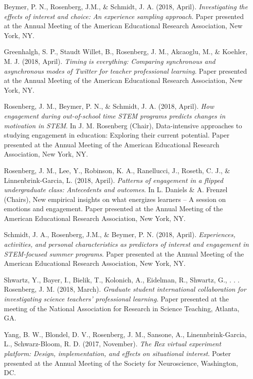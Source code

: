 \documentclass[14,]{article}
\begin{document}
Beymer, P. N., Rosenberg, J.M., \& Schmidt, J. A. (2018, April).
\emph{Investigating the effects of interest and choice: An experience
sampling approach}. Paper presented at the Annual Meeting of the
American Educational Research Association, New York, NY.

Greenhalgh, S. P., Staudt Willet, B., Rosenberg, J. M., Akcaoglu, M., \&
Koehler, M. J. (2018, April). \emph{Timing is everything: Comparing
synchronous and asynchronous modes of Twitter for teacher professional
learning}. Paper presented at the Annual Meeting of the American
Educational Research Association, New York, NY.

Rosenberg, J. M., Beymer, P. N., \& Schmidt, J. A. (2018, April).
\emph{How engagement during out-of-school time STEM programs predicts
changes in motivation in STEM}. In J. M. Rosenberg (Chair),
Data-intensive approaches to studying engagement in education: Exploring
their current potential. Paper presented at the Annual Meeting of the
American Educational Research Association, New York, NY.

Rosenberg, J. M., Lee, Y., Robinson, K. A., Ranellucci, J., Roseth, C.
J., \& Linnenbrink-Garcia, L. (2018, April). \emph{Patterns of
engagement in a flipped undergraduate class: Antecedents and outcomes}.
In L. Daniels \& A. Frenzel (Chairs), New empirical insights on what
energizes learners -- A session on emotions and engagement. Paper
presented at the Annual Meeting of the American Educational Research
Association, New York, NY.

Schmidt, J. A., Rosenberg, J.M., \& Beymer, P. N. (2018, April).
\emph{Experiences, activities, and personal characteristics as
predictors of interest and engagement in STEM-focused summer programs}.
Paper presented at the Annual Meeting of the American Educational
Research Association, New York, NY.

Shwartz, Y., Bayer, I., Bielik, T., Kolonich, A., Eidelman, R., Shwartz,
G., . . . Rosenberg, J. M. (2018, March). \emph{Graduate student
international collaboration for investigating science teachers'
professional learning}. Paper presented at the meeting of the National
Association for Research in Science Teaching, Atlanta, GA.

Yang, B. W., Blondel, D. V., Rosenberg, J. M., Sansone, A.,
Linennbrink-Garcia, L., Schwarz-Bloom, R. D. (2017, November). \emph{The
Rex virtual experiment platform: Design, implementation, and effects on
situational interest}. Poster presented at the Annual Meeting of the
Society for Neuroscience, Washington, DC.
\end{document}
